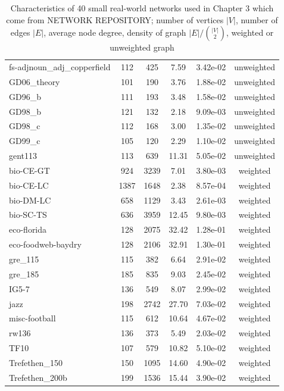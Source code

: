 \documentclass[senior,final,11pt]{iscs-thesis}
\begin{document}
\begin{table}[htb]
\begin{center}
{\begin{tabular}{l | c c c c c}
        fs-adjnoun\_adj\_copperfield & 112 & 425 & 7.59 & 3.42e-02 & unweighted\\
        GD06\_theory & 101 & 190 & 3.76 & 1.88e-02 & unweighted\\
        GD96\_b & 111 & 193 & 3.48 & 1.58e-02 & unweighted\\
        GD98\_b & 121 & 132 & 2.18 & 9.09e-03 & unweighted\\
        GD98\_c & 112 & 168 & 3.00 & 1.35e-02 & unweighted\\
        GD99\_c & 105 & 120 & 2.29 & 1.10e-02 & unweighted\\
        gent113 & 113 & 639 & 11.31 & 5.05e-02 & unweighted\\
        bio-CE-GT & 924 & 3239 & 7.01 & 3.80e-03 & weighted\\
        bio-CE-LC & 1387 & 1648 & 2.38 & 8.57e-04 & weighted\\
        bio-DM-LC & 658 & 1129 & 3.43 & 2.61e-03 & weighted\\
        bio-SC-TS & 636 & 3959 & 12.45 & 9.80e-03 & weighted\\
        eco-florida & 128 & 2075 & 32.42 & 1.28e-01 & weighted\\
        eco-foodweb-baydry & 128 & 2106 & 32.91 & 1.30e-01 & weighted\\
        gre\_115 & 115 & 382 & 6.64 & 2.91e-02 & weighted\\
        gre\_185 & 185 & 835 & 9.03 & 2.45e-02 & weighted\\
        IG5-7 & 136 & 549 & 8.07 & 2.99e-02 & weighted\\
        jazz & 198 & 2742 & 27.70 & 7.03e-02 & weighted\\
        misc-football & 115 & 612 & 10.64 & 4.67e-02 & weighted\\
        rw136 & 136 & 373 & 5.49 & 2.03e-02 & weighted\\
        TF10 & 107 & 579 & 10.82 & 5.10e-02 & weighted\\
        Trefethen\_150 & 150 & 1095 & 14.60 & 4.90e-02 & weighted\\
        Trefethen\_200b & 199 & 1536 & 15.44 & 3.90e-02 & weighted\\
      \end{tabular}
      }
      \caption{Characteristics of 40 small real-world networks used in Chapter 3 which come from NETWORK REPOSITORY; number of vertices $|V|$, number of edges $|E|$, average node degree, density of graph $|E|/ \binom{|V|}{2}$, weighted or unweighted graph}
      \label{tab:data_spe}
    \end{center}
  \end{table}
\end{document}
